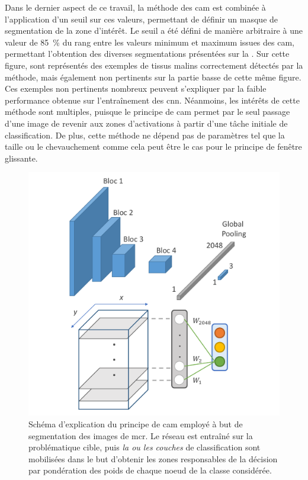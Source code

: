 Dans le dernier aspect de ce travail, la méthode des \gls{cam} est combinée à l'application d'un seuil sur ces valeurs, permettant de définir un masque de segmentation de la zone d'intérêt. Le seuil a été défini de manière arbitraire à une valeur de 85~\% du rang entre les valeurs minimum et maximum issues des \gls{cam}, permettant l'obtention des diverses segmentations présentées sur la . Sur cette figure, sont représentés des exemples de tissus malins correctement détectés par la méthode, mais également non pertinents sur la partie basse de cette même figure. Ces exemples non pertinents nombreux peuvent s'expliquer par la faible performance obtenue sur l'entraînement des \gls{cnn}. Néanmoins, les intérêts de cette méthode sont multiples, puisque le principe de \gls{cam} permet par le seul passage d'une image de revenir aux zones d'activations à partir d'une tâche initiale de classification. De plus, cette méthode ne dépend pas de paramètres tel que la taille ou le chevauchement comme cela peut être le cas pour le principe de fenêtre glissante.\par

\begin{figure}[H]
    \centering
    \includegraphics[width=\linewidth]{contents/chapter_6/resources/scheme_image_improvement_cam.pdf}
    \caption{Schéma d'explication du principe de \gls{cam} employé à but de segmentation des images de \gls{mcr}. Le réseau est entraîné sur la problématique cible, puis \textit{la ou les couches} de classification sont mobilisées dans le but d'obtenir les zones responsables de la décision par pondération des poids de chaque noeud de la classe considérée.}
    \label{fig:scheme_image_improvement_cam}
\end{figure}\par

